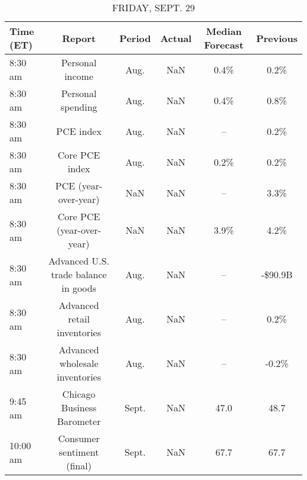 \documentclass{article}%
\begin{document}
\begin{table}[htbp]%
\caption{FRIDAY, SEPT. 29}%
\centering%
\begin{adjustbox}{width=1\textwidth}%
\begin{tabular}{lccccc}
\toprule
Time (ET) &                               Report & Period & Actual & Median Forecast & Previous \\
\midrule
  8:30 am &                      Personal income &   Aug. &    NaN &            0.4\% &     0.2\% \\
  8:30 am &                    Personal spending &   Aug. &    NaN &            0.4\% &     0.8\% \\
  8:30 am &                            PCE index &   Aug. &    NaN &              -- &     0.2\% \\
  8:30 am &                       Core PCE index &   Aug. &    NaN &            0.2\% &     0.2\% \\
  8:30 am &                 PCE (year-over-year) &    NaN &    NaN &              -- &     3.3\% \\
  8:30 am &            Core PCE (year-over-year) &    NaN &    NaN &            3.9\% &     4.2\% \\
  8:30 am & Advanced U.S. trade balance in goods &   Aug. &    NaN &              -- &  -\$90.9B \\
  8:30 am &          Advanced retail inventories &   Aug. &    NaN &              -- &     0.2\% \\
  8:30 am &       Advanced wholesale inventories &   Aug. &    NaN &              -- &    -0.2\% \\
  9:45 am &           Chicago Business Barometer &  Sept. &    NaN &            47.0 &     48.7 \\
 10:00 am &           Consumer sentiment (final) &  Sept. &    NaN &            67.7 &     67.7 \\
\bottomrule
\end{tabular}
%
\end{adjustbox}%
\end{table}
\end{document}
